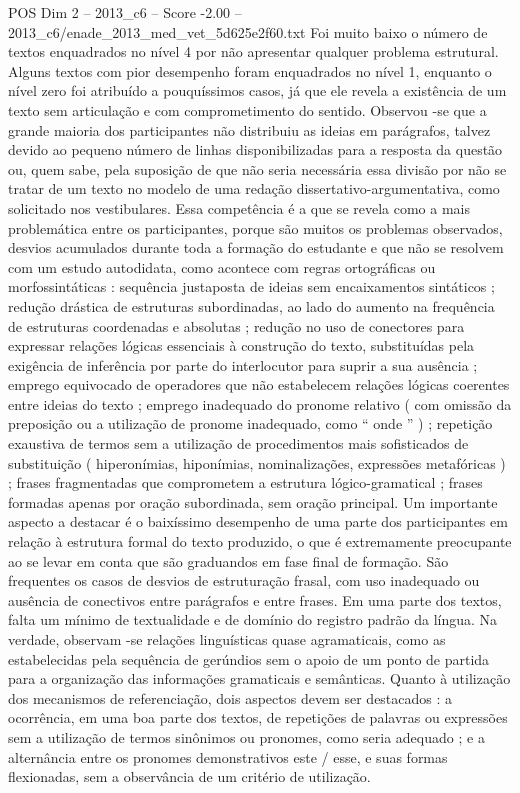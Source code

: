 \begin{textsample}{POS Dim 2 – 2013\_c6 – Score -2.00 – 2013\_c6/enade\_2013\_med\_vet\_5d625e2f60.txt}
Foi muito baixo o número de textos enquadrados no nível 4 por não apresentar qualquer problema estrutural.
Alguns textos com pior desempenho foram enquadrados no nível 1, enquanto o nível zero foi atribuído a pouquíssimos casos, já que ele revela a existência de um texto sem articulação e com comprometimento do sentido.
Observou -se que a grande maioria dos participantes não distribuiu as ideias em parágrafos, talvez devido ao pequeno número de linhas disponibilizadas para a resposta da questão ou, quem sabe, pela suposição de que não seria necessária essa divisão por não se tratar de um texto no modelo de uma redação dissertativo-argumentativa, como solicitado nos vestibulares.
Essa competência é a que se revela como a mais problemática entre os participantes, porque são muitos os problemas observados, desvios acumulados durante toda a formação do estudante e que não se resolvem com um estudo autodidata, como acontece com regras ortográficas ou morfossintáticas : sequência justaposta de ideias sem encaixamentos sintáticos ; redução drástica de estruturas subordinadas, ao lado do aumento na frequência de estruturas coordenadas e absolutas ; redução no uso de conectores para expressar relações lógicas essenciais à construção do texto, substituídas pela exigência de inferência por parte do interlocutor para suprir a sua ausência ; emprego equivocado de operadores que não estabelecem relações lógicas coerentes entre ideias do texto ; emprego inadequado do pronome relativo ( com omissão da preposição ou a utilização de pronome inadequado, como “ onde ” ) ; repetição exaustiva de termos sem a utilização de procedimentos mais sofisticados de substituição ( hiperonímias, hiponímias, nominalizações, expressões metafóricas ) ; frases fragmentadas que comprometem a estrutura lógico-gramatical ; frases formadas apenas por oração subordinada, sem oração principal.
Um importante aspecto a destacar é o baixíssimo desempenho de uma parte dos participantes em relação à estrutura formal do texto produzido, o que é extremamente preocupante ao se levar em conta que são graduandos em fase final de formação.
São frequentes os casos de desvios de estruturação frasal, com uso inadequado ou ausência de conectivos entre parágrafos e entre frases.
Em uma parte dos textos, falta um mínimo de textualidade e de domínio do registro padrão da língua.
Na verdade, observam -se relações linguísticas quase agramaticais, como as estabelecidas pela sequência de gerúndios sem o apoio de um ponto de partida para a organização das informações gramaticais e semânticas.
Quanto à utilização dos mecanismos de referenciação, dois aspectos devem ser destacados : a ocorrência, em uma boa parte dos textos, de repetições de palavras ou expressões sem a utilização de termos sinônimos ou pronomes, como seria adequado ; e a alternância entre os pronomes demonstrativos este / esse, e suas formas flexionadas, sem a observância de um critério de utilização.

\end{textsample}
